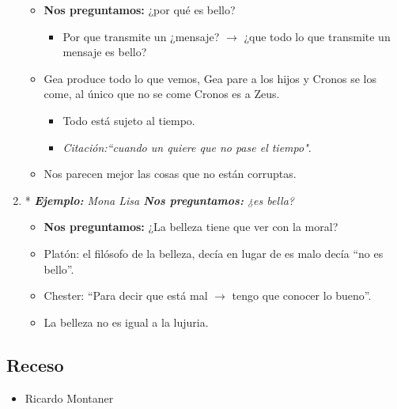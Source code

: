 \begin{enumerate}
\begin{itemize}
            \item \textbf{Nos preguntamos:} ¿por qué es bello? 
                \begin{itemize}
                    \item Por que transmite un ¿mensaje? $\rightarrow$ ¿que todo lo que transmite un mensaje es bello?
                \end{itemize}
            
            \item Gea produce todo lo que vemos, Gea pare a los hijos y Cronos se los come, al único que no se come Cronos es a Zeus.
                \begin{itemize}
                    \item Todo está sujeto al tiempo.
                    \item \emph{Citación:``cuando un quiere que no pase el tiempo"}.
                \end{itemize}
            
            \item Nos parecen mejor las cosas que no están corruptas.
        \end{itemize}
    
        
    \item* \emph{\textbf{Ejemplo: }Mona Lisa \textbf{Nos preguntamos:} ¿es bella?}
        \begin{itemize}
            \item \textbf{Nos preguntamos:} ¿La belleza tiene que ver con la moral?
            \item Platón: el filósofo de la belleza, decía en lugar de es malo decía ``no es bello''.
            \item Chester: ``Para decir que está mal $\rightarrow$ tengo que conocer lo bueno''.
            \item La belleza no es igual a la lujuria.
        \end{itemize}
\end{enumerate}

\subsection{Receso}
\begin{itemize}
    \item Ricardo Montaner 
\end{itemize}


